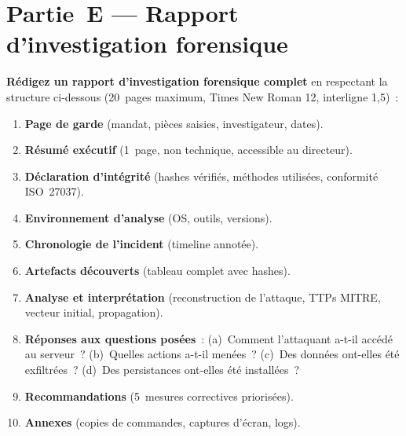 \section{Partie~E — Rapport d'investigation forensique}
\label{lab2:partieE}

\textbf{Rédigez un rapport d'investigation forensique complet}
en respectant la structure ci-dessous (20~pages maximum, Times New Roman
12, interligne 1,5)~:

\begin{enumerate}
  \item \textbf{Page de garde} (mandat, pièces saisies, investigateur,
        dates).
  \item \textbf{Résumé exécutif} (1~page, non technique, accessible
        au directeur).
  \item \textbf{Déclaration d'intégrité} (hashes vérifiés,
        méthodes utilisées, conformité ISO~27037).
  \item \textbf{Environnement d'analyse} (OS, outils, versions).
  \item \textbf{Chronologie de l'incident} (timeline annotée).
  \item \textbf{Artefacts découverts} (tableau complet avec hashes).
  \item \textbf{Analyse et interprétation} (reconstruction de l'attaque,
        TTPs MITRE, vecteur initial, propagation).
  \item \textbf{Réponses aux questions posées}~:
        (a)~Comment l'attaquant a-t-il accédé au serveur~?
        (b)~Quelles actions a-t-il menées~?
        (c)~Des données ont-elles été exfiltrées~?
        (d)~Des persistances ont-elles été installées~?
  \item \textbf{Recommandations} (5~mesures correctives priorisées).
  \item \textbf{Annexes} (copies de commandes, captures d'écran, logs).
\end{enumerate}

